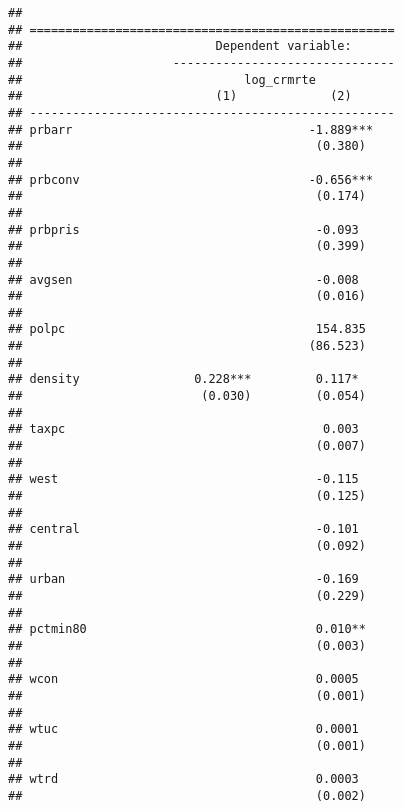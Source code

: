 \documentclass[
]{article}
\begin{document}
\begin{verbatim}
## 
## ===================================================
##                           Dependent variable:      
##                     -------------------------------
##                               log_crmrte           
##                           (1)             (2)      
## ---------------------------------------------------
## prbarr                                 -1.889***   
##                                         (0.380)    
##                                                    
## prbconv                                -0.656***   
##                                         (0.174)    
##                                                    
## prbpris                                 -0.093     
##                                         (0.399)    
##                                                    
## avgsen                                  -0.008     
##                                         (0.016)    
##                                                    
## polpc                                   154.835    
##                                        (86.523)    
##                                                    
## density                0.228***         0.117*     
##                         (0.030)         (0.054)    
##                                                    
## taxpc                                    0.003     
##                                         (0.007)    
##                                                    
## west                                    -0.115     
##                                         (0.125)    
##                                                    
## central                                 -0.101     
##                                         (0.092)    
##                                                    
## urban                                   -0.169     
##                                         (0.229)    
##                                                    
## pctmin80                                0.010**    
##                                         (0.003)    
##                                                    
## wcon                                    0.0005     
##                                         (0.001)    
##                                                    
## wtuc                                    0.0001     
##                                         (0.001)    
##                                                    
## wtrd                                    0.0003     
##                                         (0.002)    

\end{verbatim}
\end{document}
